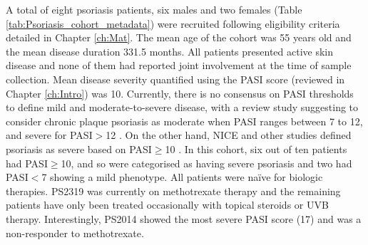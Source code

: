A total of eight psoriasis patients, six males and two females (Table \ref{tab:Psoriasis_cohort_metadata}) were recruited following eligibility criteria detailed in Chapter \ref{ch:Mat}. The mean age of the cohort was 55 years old and the mean disease duration 331.5 months. All patients presented active skin disease and none of them had reported joint involvement at the time of sample collection. Mean disease severity quantified using the PASI score (reviewed in Chapter \ref{ch:Intro}) was 10. Currently, there is no consensus on PASI thresholds to define mild and moderate-to-severe disease, with a review study suggesting to consider chronic plaque psoriasis as moderate when PASI ranges between 7 to 12, and severe for PASI$>$12 \parencite{Schmitt2005}. On the other hand, NICE and other studies defined psoriasis as severe based on PASI$\geq$10 \parencite{Woolacott2006, Finlay2005}. In this cohort, six out of ten patients had PASI$\geq$10, and so were categorised as having severe psoriasis and two had PASI$<$7 showing a mild phenotype. All patients were na\"{i}ve for biologic therapies. PS2319 was currently on methotrexate therapy and the remaining patients have only been treated occasionally with topical steroids or UVB therapy. Interestingly, PS2014 showed the most severe PASI score (17) and was a non-responder to methotrexate. 

